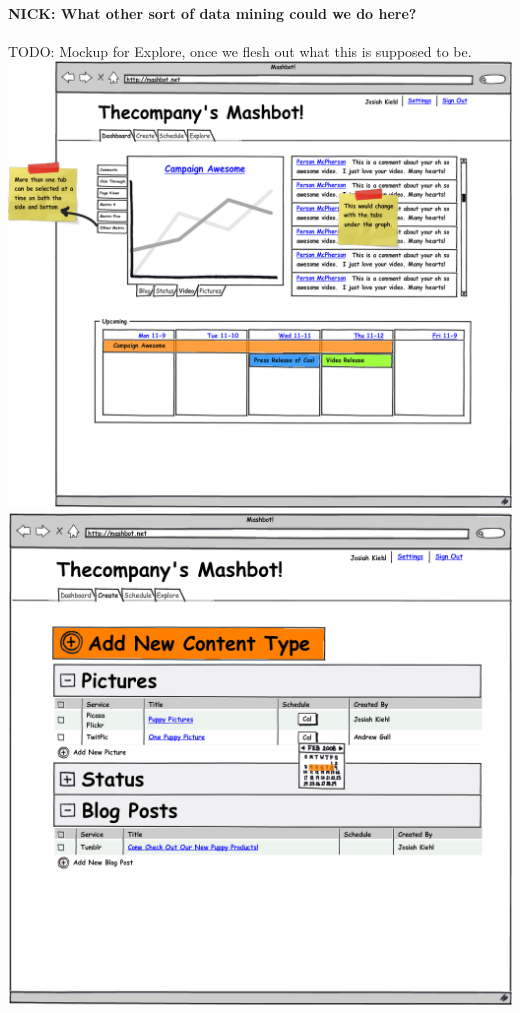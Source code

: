 \documentclass{report}
\begin{document}
        \paragraph{NICK: What other sort of data mining could we do here?}
        TODO: Mockup for Explore, once we flesh out what this is supposed to be.
        \clearpage
        \includegraphics[width=7.5in]{../mockups/dashboard.png}
        \clearpage
        \includegraphics[width=7.5in]{../mockups/create.png}
\end{document}
